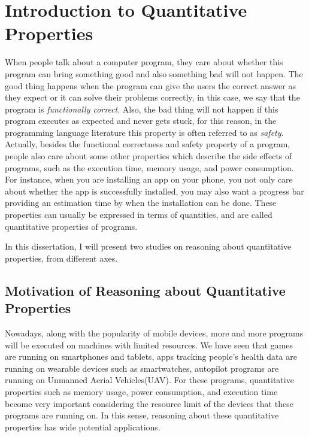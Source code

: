 \chapter{Introduction to Quantitative Properties}
\label{introduction}


When people talk about a computer program, {they care about whether this program can bring something good and also something bad will not happen. 
The good thing happens when the program can give the users the correct answer as they expect or it can solve their problems correctly, in this case, we say that the program is \emph{functionally correct}. 
Also, the bad thing will not happen if this program executes as expected and never gets stuck, for this reason, in the programming language literature this property is often referred to as \emph{safety}.}
Actually, besides the functional correctness and safety property of a program, people also care about some other properties which describe the side effects of programs, such as the execution time, memory usage, and power consumption.
For instance, when you are installing an app on your phone, you not only care about whether the app is successfully installed, you may also want a progress bar providing an estimation time by when the installation can be done. 
These properties can usually be expressed in terms of quantities, and are called quantitative properties of programs. 

In this dissertation, I will present two studies on reasoning about quantitative properties, from different axes. 



\section{Motivation of Reasoning about Quantitative Properties}

{Nowadays, along with the popularity of mobile devices, more and more programs will be executed on machines with limited resources. 
We have seen that games are running on smartphones and tablets, apps tracking people's health data are running on wearable devices such as smartwatches, autopilot programs are running on Unmanned Aerial Vehicles(UAV). 
For these programs, quantitative properties such as memory usage, power consumption, and execution time become very important considering the resource limit of the devices that these programs are running on. 
In this sense, reasoning about these quantitative properties has wide potential applications. }

